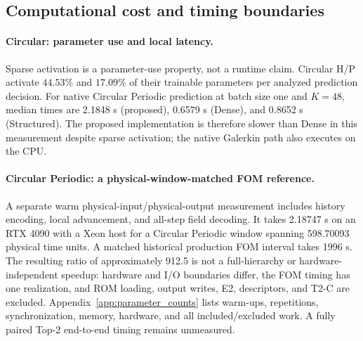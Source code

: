 \subsection{Computational cost and timing boundaries}
\label{sec:exp_cost}

\paragraph{Circular: parameter use and local latency.}
Sparse activation is a parameter-use property, not a runtime claim.
Circular H/P activate $44.53\%$ and $17.09\%$ of their trainable
parameters per analyzed prediction decision.
For native Circular Periodic prediction at batch size one and
$K=48$, median times are 2.1848 s (proposed), 0.6579 s (Dense),
and 0.8652 s (Structured).
The proposed implementation is therefore slower than Dense in this
measurement despite sparse activation; the native Galerkin path
also executes on the CPU.

\paragraph{Circular Periodic: a physical-window-matched FOM reference.}
A separate warm physical-input/physical-output measurement includes
history encoding, local advancement, and all-step field decoding.
It takes 2.18747 s on an RTX 4090 with a Xeon host for a Circular
Periodic window spanning 598.70093 physical time units.
A matched historical production FOM interval takes 1996 s.
The resulting ratio of approximately 912.5 is not a full-hierarchy
or hardware-independent speedup: hardware and I/O boundaries differ,
the FOM timing has one realization, and ROM loading, output writes,
E2, descriptors, and T2-C are excluded.
Appendix~\ref{app:parameter_counts} lists warm-ups, repetitions,
synchronization, memory, hardware, and all included/excluded work.
A fully paired Top-2 end-to-end timing remains unmeasured.
